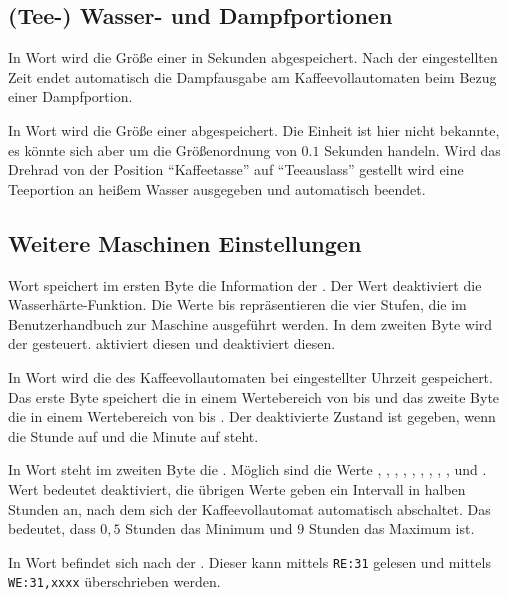 \subsection{(Tee-) Wasser- und Dampfportionen}
In Wort  wird die Größe einer  in Sekunden abgespeichert.
Nach der eingestellten Zeit endet automatisch die Dampfausgabe am Kaffeevollautomaten beim Bezug einer Dampfportion.

In Wort  wird die Größe einer  abgespeichert.
Die Einheit ist hier nicht bekannte, es könnte sich aber um die Größenordnung von $0.1$ Sekunden handeln.
Wird das Drehrad von der Position "`Kaffeetasse"' auf "`Teeauslass"' gestellt wird eine Teeportion an heißem Wasser ausgegeben und automatisch beendet.

\subsection{Weitere Maschinen Einstellungen}
Wort  speichert im ersten Byte die Information der .
Der Wert  deaktiviert die Wasserhärte-Funktion.
Die Werte  bis  repräsentieren die vier Stufen, die im Benutzerhandbuch zur Maschine ausgeführt werden.
In dem zweiten Byte wird der  gesteuert.
 aktiviert diesen und  deaktiviert diesen.

In Wort  wird die  des Kaffeevollautomaten bei eingestellter Uhrzeit gespeichert.
Das erste Byte speichert die  in einem Wertebereich von  bis  und das zweite Byte die  in einem Wertebereich von  bis .
Der deaktivierte Zustand ist gegeben, wenn die Stunde auf  und die Minute auf  steht.

In Wort  steht im zweiten Byte die .
Möglich sind die Werte , , , , , , , , ,  und .
Wert  bedeutet deaktiviert, die übrigen Werte geben ein Intervall in halben Stunden an, nach dem sich der Kaffeevollautomat automatisch abschaltet.
Das bedeutet, dass $0,5$ Stunden das Minimum und $9$ Stunden das Maximum ist.

In Wort  befindet sich nach \cite{GitCoffeeMachine} der .
Dieser kann mittels \texttt{RE:31} gelesen und mittels \texttt{WE:31,xxxx} überschrieben werden.

